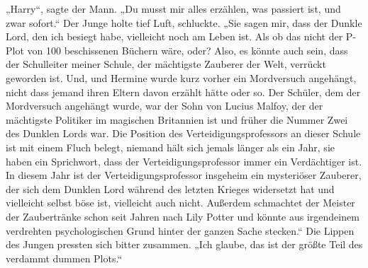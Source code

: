 „Harry“, sagte der Mann. „Du musst mir alles erzählen, was passiert ist, und zwar sofort.“
Der Junge holte tief Luft, schluckte.
„Sie sagen mir, dass der Dunkle Lord, den ich besiegt habe, vielleicht noch am Leben ist. Als ob das nicht der P-Plot von 100 beschissenen Büchern wäre, oder? Also, es könnte auch sein, dass der Schulleiter meiner Schule, der mächtigste Zauberer der Welt, verrückt geworden ist. Und, und Hermine wurde kurz vorher ein Mordversuch angehängt, nicht dass jemand ihren Eltern davon erzählt hätte oder so. Der Schüler, dem der Mordversuch angehängt wurde, war der Sohn von Lucius Malfoy, der der mächtigste Politiker im magischen Britannien ist und früher die Nummer Zwei des Dunklen Lords war. Die Position des Verteidigungsprofessors an dieser Schule ist mit einem Fluch belegt, niemand hält sich jemals länger als ein Jahr, sie haben ein Sprichwort, dass der Verteidigungsprofessor immer ein Verdächtiger ist. In diesem Jahr ist der Verteidigungsprofessor insgeheim ein mysteriöser Zauberer, der sich dem Dunklen Lord während des letzten Krieges widersetzt hat und vielleicht selbst böse ist, vielleicht auch nicht. Außerdem schmachtet der Meister der Zaubertränke schon seit Jahren nach Lily Potter und könnte aus irgendeinem verdrehten psychologischen Grund hinter der ganzen Sache stecken.“
Die Lippen des Jungen pressten sich bitter zusammen.
„Ich glaube, das ist der größte Teil des verdammt dummen Plots.“

